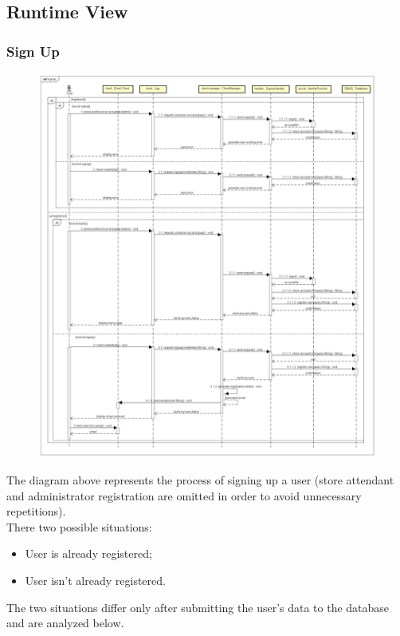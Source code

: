 \documentclass[table, 12pt]{article}
\begin{document}
\subsection{Runtime View}
\subsubsection{Sign Up}
\begin{figure}[H]
    \begin{center}
        \includegraphics[width=\textwidth]{assets/Sequence-Diagram/signup.png}
    \end{center}
\end{figure}
The diagram above represents the process of signing up a user (store attendant and administrator  registration are omitted in order to avoid unnecessary repetitions).\\
There two possible situations:
\begin{itemize}
    \item User is already registered;
    \item User isn't already registered.
\end{itemize}
The two situations differ only after submitting the user's data to the database and are analyzed below.\\
\end{document}
